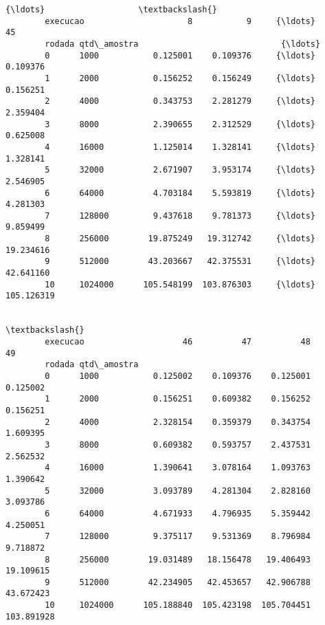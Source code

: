 \documentclass[11pt]{article}
\begin{document}
\begin{Verbatim}[commandchars=\\\{\}]
                                                       {\ldots}                   \textbackslash{}
        execucao                     8           9     {\ldots}               45   
        rodada qtd\_amostra                             {\ldots}                    
        0      1000           0.125001    0.109376     {\ldots}         0.109376   
        1      2000           0.156252    0.156249     {\ldots}         0.156251   
        2      4000           0.343753    2.281279     {\ldots}         2.359404   
        3      8000           2.390655    2.312529     {\ldots}         0.625008   
        4      16000          1.125014    1.328141     {\ldots}         1.328141   
        5      32000          2.671907    3.953174     {\ldots}         2.546905   
        6      64000          4.703184    5.593819     {\ldots}         4.281303   
        7      128000         9.437618    9.781373     {\ldots}         9.859499   
        8      256000        19.875249   19.312742     {\ldots}        19.234616   
        9      512000        43.203667   42.375531     {\ldots}        42.641160   
        10     1024000      105.548199  103.876303     {\ldots}       105.126319   
        
                                                                            \textbackslash{}
        execucao                    46          47          48          49   
        rodada qtd\_amostra                                                   
        0      1000           0.125002    0.109376    0.125001    0.125002   
        1      2000           0.156251    0.609382    0.156252    0.156251   
        2      4000           2.328154    0.359379    0.343754    1.609395   
        3      8000           0.609382    0.593757    2.437531    2.562532   
        4      16000          1.390641    3.078164    1.093763    1.390642   
        5      32000          3.093789    4.281304    2.828160    3.093786   
        6      64000          4.671933    4.796935    5.359442    4.250051   
        7      128000         9.375117    9.531369    8.796984    9.718872   
        8      256000        19.031489   18.156478   19.406493   19.109615   
        9      512000        42.234905   42.453657   42.906788   43.672423   
        10     1024000      105.188840  105.423198  105.704451  103.891928   
        

\end{Verbatim}
\end{document}
